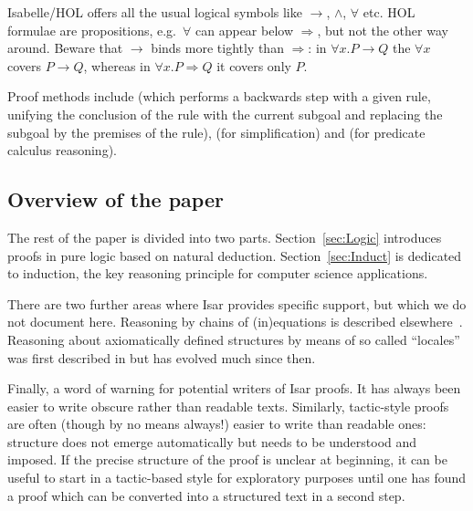 Isabelle/HOL offers all the usual logical symbols like $\longrightarrow$, $\land$,
$\forall$ etc. HOL formulae are propositions, e.g.\ $\forall$ can appear below
$\Longrightarrow$, but not the other way around. Beware that $\longrightarrow$ binds more
tightly than $\Longrightarrow$: in $\forall x. P \longrightarrow Q$ the $\forall x$ covers $P \longrightarrow Q$, whereas
in $\forall x. P \Longrightarrow Q$ it covers only $P$.

Proof methods include  (which performs a backwards
step with a given rule, unifying the conclusion of the rule with the
current subgoal and replacing the subgoal by the premises of the
rule),  (for simplification) and  (for predicate
calculus reasoning).

\subsection{Overview of the paper}

The rest of the paper is divided into two parts.
Section~\ref{sec:Logic} introduces proofs in pure logic based on
natural deduction. Section~\ref{sec:Induct} is dedicated to induction,
the key reasoning principle for computer science applications.

There are two further areas where Isar provides specific support, but
which we do not document here. Reasoning by chains of (in)equations is
described elsewhere~\cite{BauerW-TPHOLs01}.  Reasoning about
axiomatically defined structures by means of so called ``locales'' was
first described in \cite{KWP-TPHOLs99} but has evolved much since
then.

Finally, a word of warning for potential writers of Isar proofs.  It
has always been easier to write obscure rather than readable texts.
Similarly, tactic-style proofs are often (though by no means always!)
easier to write than readable ones: structure does not emerge
automatically but needs to be understood and imposed. If the precise
structure of the proof is unclear at beginning, it can be useful to
start in a tactic-based style for exploratory purposes until one has
found a proof which can be converted into a structured text in a
second step.

